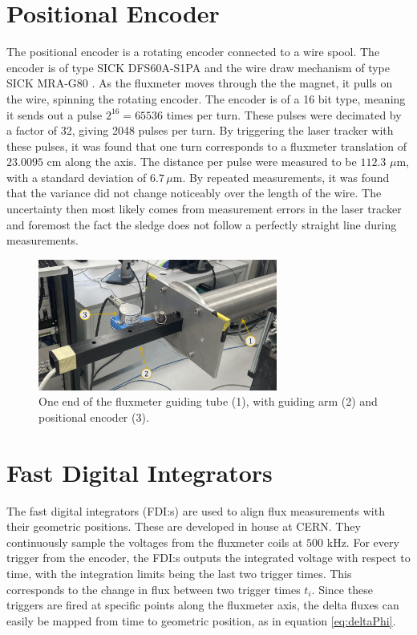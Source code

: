 \section{Positional Encoder}
The positional encoder is a rotating encoder connected to a wire spool.
The encoder is of type SICK DFS60A-S1PA \cite{noauthor_dfs60a-s1pa65536_nodate}
and the wire draw mechanism of type SICK MRA-G80 \cite{noauthor_mra-g080-103d3_nodate}.
As the fluxmeter moves through the the magnet, it pulls on the wire,
spinning the rotating encoder. The encoder is of a 16 bit type, meaning
it sends out a pulse $2^{16} = 65536$ times per turn. These pulses were
decimated by a factor of 32, giving 2048 pulses per turn. By triggering
the laser tracker with these pulses, it was found that one turn corresponds
to a fluxmeter translation of $23.0095$ cm along the axis. The distance
per pulse were measured to be $112.3$ $\mu$m, with a standard deviation of
$6.7 \, \mu \text{m}$. By repeated measurements, it was found that the
variance did not change noticeably over the length of the wire. The
uncertainty then most likely comes from measurement errors in the laser
tracker and foremost the fact the sledge does not follow a perfectly
straight line during measurements.

\begin{figure}[h]
    \centering
    \includegraphics[width=0.7\textwidth]{figs/encoder}
    \caption{One end of the fluxmeter guiding tube (1), with guiding arm (2)
        and positional encoder (3).}
    \label{fig:encoderpic}
\end{figure}

\section{Fast Digital Integrators}
The fast digital integrators (FDI:s) are used to align flux measurements
with their geometric positions. These are developed in house at CERN.
\cite{arpaia_fast_2006}
They continuously sample the voltages
from the fluxmeter coils at $500$ kHz. For every trigger from the encoder,
the FDI:s outputs the integrated voltage with respect to time, with the
integration limits being the last two trigger times. This
corresponds to the change in flux between two trigger times $t_i$. Since these
triggers are fired at specific points along the fluxmeter axis, the
delta fluxes can easily be mapped from time to geometric position, as in
equation \ref{eq:deltaPhi}.

